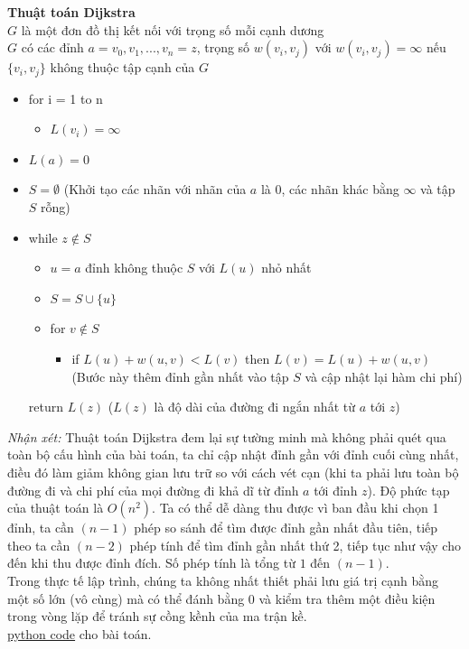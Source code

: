 \begin{tcolorbox}[colframe=gray,colback=gray!20,left=10pt,right=10pt,top=10pt,bottom=10pt]
    \textbf{Thuật toán Dijkstra} \\
    $G$ là một đơn đồ thị kết nối với trọng số mỗi cạnh dương \\
    $G$ có các đỉnh $a = v_0, v_1, ..., v_n = z$, trọng số 
    $w(v_i, v_j)$ với $w(v_i, v_j) = \infty$ nếu $\{v_i, v_j\}$ không thuộc 
    tập cạnh của $G$

    \begin{itemize}
        \item [] for i = 1 to n 
        \begin{itemize}
            \item [] $L(v_i) = \infty$
        \end{itemize} 
        \item [] $L(a) = 0$
        \item [] $S = \emptyset $ (Khởi tạo các nhãn với nhãn của $a$ là $0$, 
        các nhãn khác bằng $\infty$ và tập $S$ rỗng)
        \item [] while $z \notin S$
        \begin{itemize}
          \item [] $u = a$ đỉnh không thuộc $S$ với $L(u)$ nhỏ nhất
          \item [] $S = S \cup \{u\}$
          \item [] for $v \notin S$
          \begin{itemize}
            \item [] if $L(u) + w(u,v) < L(v)$ then $L(v) = L(u) + w(u,v)$
            (Bước này thêm đỉnh gần nhất vào tập $S$ và cập nhật lại hàm chi phí)
          \end{itemize}
        \end{itemize}
        return $L(z)$ ($L(z)$ là độ dài của đường đi ngắn nhất từ $a$ tới $z$)
    \end{itemize}
  \end{tcolorbox}

\textit{Nhận xét: } Thuật toán Dijkstra đem lại
sự tường minh mà không phải quét qua toàn bộ cấu hình của bài toán, 
ta chỉ cập nhật đỉnh gần với đỉnh cuối cùng nhất, điều đó làm giảm không gian lưu 
trữ so với cách vét cạn (khi ta phải lưu toàn bộ đường đi và chi phí của mọi đường
đi khả dĩ từ đỉnh $a$ tới đỉnh $z$). Độ phức tạp của thuật toán là $O(n^2)$. 
Ta có thể dễ dàng thu được vì ban đầu khi chọn 1 đỉnh, ta cần $(n-1)$ phép so sánh
để tìm được đỉnh gần nhất đầu tiên, tiếp theo ta cần $(n-2)$ phép tính để tìm đỉnh 
gần nhất thứ 2, tiếp tục như vậy cho đến khi thu được đỉnh đích. Số phép tính là tổng 
từ $1$ đến $(n-1)$. \\

Trong thực tế lập trình, chúng ta không nhất thiết phải lưu giá trị cạnh bằng một 
số lớn (vô cùng) mà có thể đánh bằng $0$ và kiểm tra thêm một điều kiện trong vòng 
lặp để tránh sự cồng kềnh của ma trận kề. \\

\href{https://github.com/batman0911/dma_homework/blob/master/hw_02/src/shortest_path.ipynb}{python code} 
    cho bài toán.